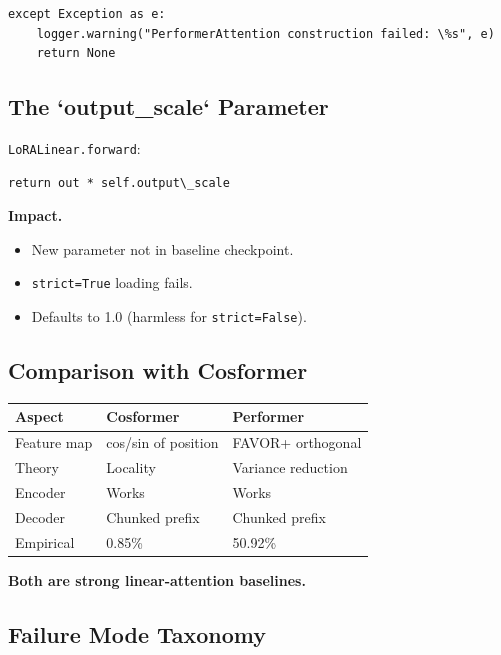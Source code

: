 \begin{lstlisting}
except Exception as e:
    logger.warning("PerformerAttention construction failed: \%s", e)
    return None
\end{lstlisting}

\subsection{The `output\_scale` Parameter}

\texttt{LoRALinear.forward}:

\begin{lstlisting}
return out * self.output\_scale
\end{lstlisting}

\textbf{Impact.}

\begin{itemize}
\item New parameter not in baseline checkpoint.
\item \texttt{strict=True} loading fails.
\item Defaults to 1.0 (harmless for \texttt{strict=False}).

\end{itemize}
\subsection{Comparison with Cosformer}

\begin{table}[H]
\centering
\small
\begin{tabular}{lll}
\toprule
\textbf{Aspect} & \textbf{Cosformer} & \textbf{Performer} \\
\midrule
Feature map & cos/sin of position & FAVOR+ orthogonal \\
Theory & Locality & Variance reduction \\
Encoder & Works & Works \\
Decoder & Chunked prefix & Chunked prefix \\
Empirical & 0.85\% & 50.92\% \\
\bottomrule
\end{tabular}
\end{table}

\textbf{Both are strong linear-attention baselines.}

\subsection{Failure Mode Taxonomy}

